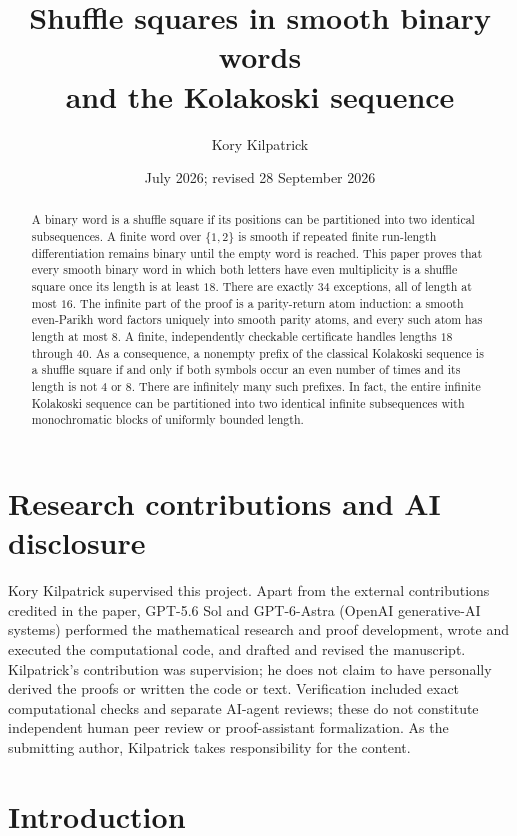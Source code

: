 \documentclass[11pt]{article}
\title{Shuffle squares in smooth binary words\\
and the Kolakoski sequence}
\author{Kory Kilpatrick}
\date{July 2026; revised 28 September 2026}
\theoremstyle{definition}
\theoremstyle{remark}
\begin{document}
\maketitle

\begin{abstract}
A binary word is a shuffle square if its positions can be partitioned
into two identical subsequences.  A finite word over $\{1,2\}$ is smooth
if repeated finite run-length differentiation remains binary until the
empty word is reached.  This paper proves that every smooth binary word in which
both letters have even multiplicity is a shuffle square once its length
is at least $18$.  There are exactly $34$ exceptions, all of length at
most $16$.  The infinite part of the proof is a parity-return atom
induction: a smooth even-Parikh word factors uniquely into smooth parity
atoms, and every such atom has length at most $8$.  A finite,
independently checkable certificate handles lengths $18$ through $40$.
As a consequence, a nonempty prefix of the classical Kolakoski sequence
is a shuffle square if and only if both symbols occur an even number of
times and its length is not $4$ or $8$.  There are infinitely many such
prefixes.  In fact, the entire infinite Kolakoski sequence can be
partitioned into two identical infinite subsequences with monochromatic
blocks of uniformly bounded length.
\end{abstract}

\section*{Research contributions and AI disclosure}

Kory Kilpatrick supervised this project. Apart from the external
contributions credited in the paper, GPT-5.6 Sol and GPT-6-Astra
(OpenAI generative-AI systems) performed the mathematical research and
proof development, wrote and executed the computational code, and
drafted and revised the manuscript. Kilpatrick's contribution was
supervision; he does not claim to have personally derived the proofs or
written the code or text. Verification included exact computational
checks and separate AI-agent reviews; these do not constitute independent
human peer review or proof-assistant formalization. As the submitting
author, Kilpatrick takes responsibility for the content.

\section{Introduction}
\end{document}
